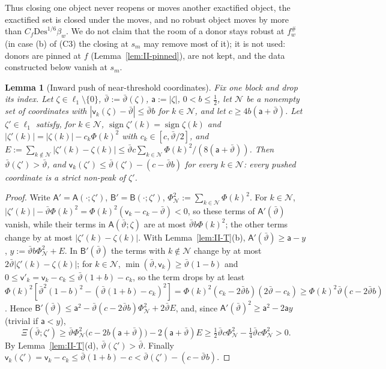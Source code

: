 \documentclass[10pt]{amsart}
\newtheorem{lemma}[theorem]{Lemma}
\theoremstyle{definition}
\theoremstyle{remark}
\newcommand{\sgn}{\operatorname{sign}}
\begin{document}
Thus closing one object never reopens or moves another exactified object,
the exactified set is closed under the moves, and no robust object moves by
more than $C_f\mathrm{Des}^{1/6}\beta_w$.  We do not claim that the room of
a donor stays robust at $f^\#_w$ (in case (b) of (C3) the closing at $s_m$
may remove most of it); it is not used: donors are pinned at $f$
(Lemma~\ref{lem:II-pinned}), are not kept, and the data constructed below
vanish at $s_m$.

\begin{lemma}[Inward push of near-threshold coordinates]\label{lem:II-IP}
Fix one block and drop its index.  Let $\zeta\in\ell_1\setminus\{0\}$,
$\bar\vartheta:=\bar\vartheta(\zeta)$, $\mathsf a:=|\zeta|$, $0<b\le\frac12$,
let $\mathcal N$ be a nonempty set of coordinates with $|\mathsf v_k(\zeta)-
\bar\vartheta|\le\bar\vartheta b$ for $k\in\mathcal N$, and let $c\ge4b(\mathsf
a+\bar\vartheta)$.  Let $\zeta'\in\ell_1$ satisfy, for $k\in\mathcal N$,
$\sgn\zeta'(k)=\sgn\zeta(k)$ and $|\zeta'(k)|=|\zeta(k)|-c_k\Phi(k)^2$ with
$c_k\in[c,\bar\vartheta/2]$, and $E:=\sum_{k\notin\mathcal N}|\zeta'(k)-\zeta(k)|
\le\bar\vartheta c\sum_{k\in\mathcal N}\Phi(k)^2/(8(\mathsf a+\bar\vartheta))$.
Then $\bar\vartheta(\zeta')>\bar\vartheta$, and $\mathsf v_k(\zeta')\le
\bar\vartheta(\zeta')-(c-\bar\vartheta b)$ for every $k\in\mathcal N$: every
pushed coordinate is a strict non-peak of $\zeta'$.
\end{lemma}

\begin{proof}
Write $\mathsf A'=\mathsf A(\cdot;\zeta')$, $\mathsf B'=\mathsf B(\cdot;\zeta')$,
$\Phi_{\mathcal N}^2:=\sum_{k\in\mathcal N}\Phi(k)^2$.  For $k\in\mathcal N$,
$|\zeta'(k)|-\bar\vartheta\Phi(k)^2=\Phi(k)^2(\mathsf v_k-c_k-\bar\vartheta)<0$,
so these terms of $\mathsf A'(\bar\vartheta)$ vanish, while their terms in
$\mathsf A(\bar\vartheta;\zeta)$ are at most $\bar\vartheta b\Phi(k)^2$; the
other terms change by at most $|\zeta'(k)-\zeta(k)|$.  With
Lemma~\ref{lem:II-T}(b), $\mathsf A'(\bar\vartheta)\ge\mathsf a-y$,
$y:=\bar\vartheta b\Phi_{\mathcal N}^2+E$.  In $\mathsf B'(\bar\vartheta)$ the
terms with $k\notin\mathcal N$ change by at most $2\bar\vartheta|\zeta'(k)-
\zeta(k)|$; for $k\in\mathcal N$, $\min(\bar\vartheta,\mathsf v_k)\ge
\bar\vartheta(1-b)$ and $0\le\mathsf v'_k=\mathsf v_k-c_k\le\bar\vartheta(1+b)-
c_k$, so the term drops by at least $\Phi(k)^2[\bar\vartheta^2(1-b)^2-
(\bar\vartheta(1+b)-c_k)^2]=\Phi(k)^2(c_k-2\bar\vartheta b)(2\bar\vartheta-c_k)
\ge\Phi(k)^2\bar\vartheta(c-2\bar\vartheta b)$.  Hence $\mathsf B'(\bar\vartheta)
\le\mathsf a^2-\bar\vartheta(c-2\bar\vartheta b)\Phi_{\mathcal N}^2+2\bar\vartheta
E$, and, since $\mathsf A'(\bar\vartheta)^2\ge\mathsf a^2-2\mathsf ay$ (trivial
if $\mathsf a<y$),
\[
 \Xi(\bar\vartheta;\zeta')\ge\bar\vartheta\Phi_{\mathcal N}^2\big(c-2b(\mathsf a+
 \bar\vartheta)\big)-2(\mathsf a+\bar\vartheta)E\ge\tfrac12\bar\vartheta c
 \Phi_{\mathcal N}^2-\tfrac14\bar\vartheta c\Phi_{\mathcal N}^2>0 .
\]
By Lemma~\ref{lem:II-T}(d), $\bar\vartheta(\zeta')>\bar\vartheta$.  Finally
$\mathsf v_k(\zeta')=\mathsf v_k-c_k\le\bar\vartheta(1+b)-c<\bar\vartheta(\zeta')-
(c-\bar\vartheta b)$.
\end{proof}
\end{document}
